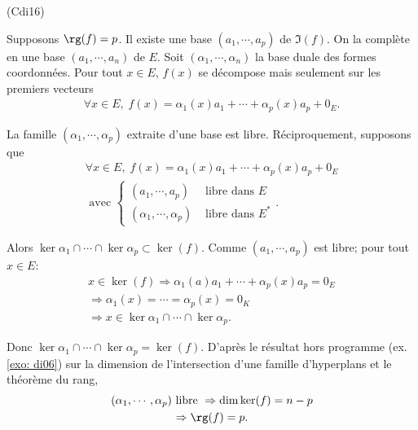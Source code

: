 \begin{tiny}(Cdi16)\end{tiny} Supposons $\rg(f) = p$.\newline
Il existe une base $(a_1,\cdots,a_p)$ de $\Im(f)$. On la complète en une base $(a_1,\cdots, a_n)$ de $E$. Soit $(\alpha_1,\cdots,\alpha_n)$ la base duale des formes coordonnées. Pour tout $x\in E$, $f(x)$ se décompose mais seulement sur les premiers vecteurs
\begin{multline*}
 \forall x \in E, \; f(x) 
 = \alpha_1(x)a_1 + \cdots + \alpha_p(x)a_p + 0_E. 
\end{multline*}

La famille $(\alpha_1,\cdots,\alpha_p)$ extraite d'une base est libre.\newline
Réciproquement, supposons que
\begin{multline*}
  \forall x \in E, \; f(x) 
 = \alpha_1(x)a_1 + \cdots + \alpha_p(x)a_p + 0_E \\
 \text{ avec }
 \left\lbrace 
 \begin{aligned}
  (a_1,\cdots,a_p) &\text{ libre dans } E\\
  (\alpha_1,\cdots,\alpha_p) &\text{ libre dans } E^*
 \end{aligned}
\right. .
\end{multline*}

Alors $\ker \alpha_1 \cap \cdots \cap \ker \alpha_p \subset \ker(f)$.\newline
Comme $(a_1,\cdots,a_p)$ est libre; pour tout $x\in E$:
\begin{multline*}
 x\in \ker(f) 
 \Rightarrow \alpha_1(a)a_1 + \cdots + \alpha_p(x)a_p = 0_E\\
 \Rightarrow \alpha_1(x) = \cdots = \alpha_p(x) = 0_K\\
 \Rightarrow x \in \ker \alpha_1 \cap \cdots \cap \ker \alpha_p.
\end{multline*}

Donc $\ker \alpha_1 \cap \cdots \cap \ker \alpha_p = \ker(f)$.\newline
D'après le résultat hors programme (ex. \ref{exo: di06}) sur la dimension de l'intersection d'une famille d'hyperplans et le théorème du rang,
\begin{multline*}
(\alpha_1,\cdots,\alpha_p)\text{ libre }
\Rightarrow \dim \ker(f) = n-p \\
\Rightarrow \rg(f) = p .
\end{multline*}

